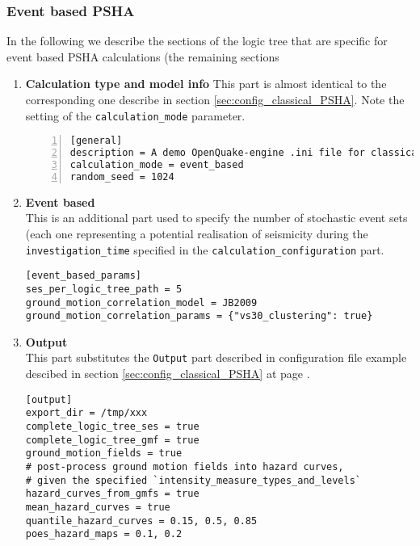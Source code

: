 \subsubsection{Event based PSHA}
%
In the following we describe the sections of the logic tree that are 
specific for event based PSHA calculations (the remaining sections 
\begin{enumerate}
\item \textbf{Calculation type and model info}
    This part is almost identical to the corresponding one 
    describe in section \ref{sec:config_classical_PSHA}. Note
    the setting of the \texttt{calculation\_mode} parameter.
\begin{Verbatim}[frame=single, commandchars=\\\{\}, fontsize=\small,
    numbers=left, numbersep=2pt]
[general]
description = A demo OpenQuake-engine .ini file for classical PSHA
calculation_mode = event_based
random_seed = 1024
\end{Verbatim}
%
\item \textbf{Event based} \hfill \\
This is an additional part used to specify the number of stochastic 
event sets (each one representing a potential realisation of seismicity
during the \texttt{in\-ves\-ti\-gation\_time} specified in the 
\texttt{calculation\_configuration} part.
\begin{Verbatim}[frame=single, commandchars=\\\{\}, fontsize=\small]
[event_based_params]
ses_per_logic_tree_path = 5
ground_motion_correlation_model = JB2009
ground_motion_correlation_params = {"vs30_clustering": true}
\end{Verbatim}
%
\item \textbf{Output} \hfill \\
This part substitutes the \texttt{Output} part described in 
configuration file example descibed in section \ref{sec:config_classical_PSHA}
at page \pageref{sec:config_classical_PSHA}.
\begin{Verbatim}[frame=single, commandchars=\\\{\}, fontsize=\small]
[output]
export_dir = /tmp/xxx
complete_logic_tree_ses = true
complete_logic_tree_gmf = true
ground_motion_fields = true
# post-process ground motion fields into hazard curves,
# given the specified `intensity_measure_types_and_levels`
hazard_curves_from_gmfs = true
mean_hazard_curves = true
quantile_hazard_curves = 0.15, 0.5, 0.85
poes_hazard_maps = 0.1, 0.2
\end{Verbatim}
%
\end{enumerate}
